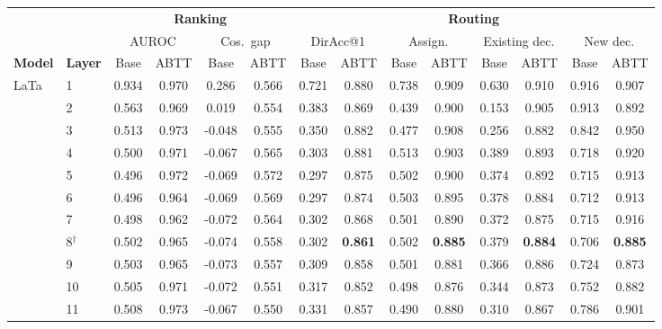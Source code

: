 \begin{table}[t]
\centering
\scriptsize
\setlength{\tabcolsep}{3pt}
\begin{tabular}{llcccccccccccc}
\toprule
\multicolumn{2}{c}{} & \multicolumn{4}{c}{\textbf{Ranking}} & \multicolumn{8}{c}{\textbf{Routing}} \\
\cmidrule(lr){3-6}\cmidrule(lr){7-14}
 &  & \multicolumn{2}{c}{AUROC} & \multicolumn{2}{c}{Cos.\ gap} & \multicolumn{2}{c}{DirAcc@1} & \multicolumn{2}{c}{Assign.} & \multicolumn{2}{c}{Existing dec.} & \multicolumn{2}{c}{New dec.} \\
\cmidrule(lr){3-4}\cmidrule(lr){5-6}\cmidrule(lr){7-8}\cmidrule(lr){9-10}\cmidrule(lr){11-12}\cmidrule(lr){13-14}
\textbf{Model} & \textbf{Layer} & Base & ABTT & Base & ABTT & Base & ABTT & Base & ABTT & Base & ABTT & Base & ABTT \\
\midrule
LaTa & 1 & 0.934 & 0.970 & 0.286 & 0.566 & 0.721 & 0.880 & 0.738 & 0.909 & 0.630 & 0.910 & 0.916 & 0.907 \\
 & 2 & 0.563 & 0.969 & 0.019 & 0.554 & 0.383 & 0.869 & 0.439 & 0.900 & 0.153 & 0.905 & 0.913 & 0.892 \\
 & 3 & 0.513 & 0.973 & -0.048 & 0.555 & 0.350 & 0.882 & 0.477 & 0.908 & 0.256 & 0.882 & 0.842 & 0.950 \\
 & 4 & 0.500 & 0.971 & -0.067 & 0.565 & 0.303 & 0.881 & 0.513 & 0.903 & 0.389 & 0.893 & 0.718 & 0.920 \\
 & 5 & 0.496 & 0.972 & -0.069 & 0.572 & 0.297 & 0.875 & 0.502 & 0.900 & 0.374 & 0.892 & 0.715 & 0.913 \\
 & 6 & 0.496 & 0.964 & -0.069 & 0.569 & 0.297 & 0.874 & 0.503 & 0.895 & 0.378 & 0.884 & 0.712 & 0.913 \\
 & 7 & 0.498 & 0.962 & -0.072 & 0.564 & 0.302 & 0.868 & 0.501 & 0.890 & 0.372 & 0.875 & 0.715 & 0.916 \\
 & 8$^{\dagger}$ & 0.502 & 0.965 & -0.074 & 0.558 & 0.302 & \textbf{0.861} & 0.502 & \textbf{0.885} & 0.379 & \textbf{0.884} & 0.706 & \textbf{0.885} \\
 & 9 & 0.503 & 0.965 & -0.073 & 0.557 & 0.309 & 0.858 & 0.501 & 0.881 & 0.366 & 0.886 & 0.724 & 0.873 \\
 & 10 & 0.505 & 0.971 & -0.072 & 0.551 & 0.317 & 0.852 & 0.498 & 0.876 & 0.344 & 0.873 & 0.752 & 0.882 \\
 & 11 & 0.508 & 0.973 & -0.067 & 0.550 & 0.331 & 0.857 & 0.490 & 0.880 & 0.310 & 0.867 & 0.786 & 0.901 \\

\end{tabular}
\end{table}
